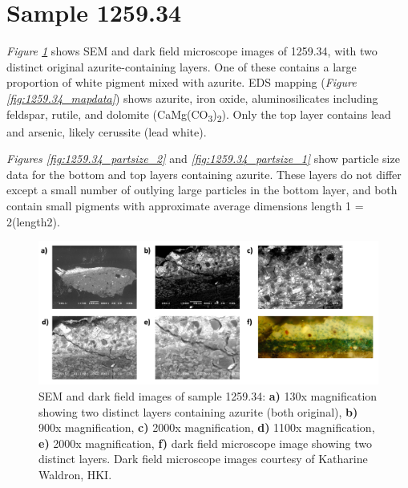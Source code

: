 \section{Sample 1259.34}

\textit{Figure \ref{fig:1259.34_imgs}} shows SEM and dark field microscope images of 1259.34, with two distinct original azurite-containing layers. One of these contains a large proportion of white pigment mixed with azurite. EDS mapping (\textit{Figure \ref{fig:1259.34_mapdata}}) shows azurite, iron oxide, aluminosilicates including feldspar, rutile, and dolomite (CaMg(CO\textsubscript{3})\textsubscript{2}). Only the top layer contains lead and arsenic, likely cerussite (lead white).

\textit{Figures \ref{fig:1259.34_partsize_2}} and \textit{\ref{fig:1259.34_partsize_1}} show particle size data for the bottom and top layers containing azurite. These layers do not differ except a small number of outlying large particles in the bottom layer, and both contain small pigments with approximate average dimensions length 1 = 2(length2). 

\begin{figure}[H]
  \centering
  \includegraphics[width=0.8\linewidth]{1259.34_imgs}
\caption[SEM and dark field images of sample 1259.34.]{SEM and dark field images of sample 1259.34: \textbf{a)} 130x magnification showing two distinct layers containing azurite (both original), \textbf{b)} 900x magnification, \textbf{c)} 2000x magnification, \textbf{d)} 1100x magnification, \textbf{e)} 2000x magnification, \textbf{f)} dark field microscope image showing two distinct layers. Dark field microscope images courtesy of Katharine Waldron, HKI.}
\label{fig:1259.34_imgs}
\end{figure}

